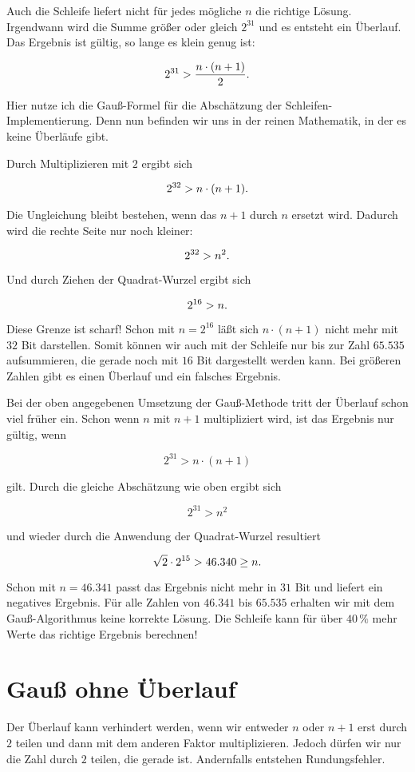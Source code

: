 Auch die Schleife liefert nicht für jedes mögliche $n$ die richtige Lösung.
Irgendwann wird die Summe größer oder gleich $2^{31}$ und es entsteht ein
Überlauf.
Das Ergebnis ist gültig, so lange es klein genug ist:

$$2^{31} > {n\cdot(n + 1)\over 2}\hbox{.}$$

\noindent Hier nutze ich die Gauß-Formel für die Abschätzung der
Schleifen-Implementierung.
Denn nun befinden wir uns in der reinen Mathematik, in der es keine
Überläufe gibt.

Durch Multiplizieren mit $2$ ergibt sich

$$2^{32} > n\cdot(n+1)\hbox{.}$$

\noindent Die Ungleichung bleibt bestehen, wenn das $n+1$ durch $n$
ersetzt wird. Dadurch wird die rechte Seite nur noch kleiner:

$$2^{32} > n^2\hbox{.}$$

\noindent Und durch Ziehen der Quadrat-Wurzel ergibt sich

$$2^{16} > n\hbox{.}$$

\noindent Diese Grenze ist scharf! Schon mit $n=2^{16}$ läßt sich
$n\cdot(n+1)$ nicht mehr mit $32$ Bit darstellen.
Somit können wir auch mit der Schleife nur bis zur Zahl $65.535$
aufsummieren, die gerade noch mit $16$ Bit dargestellt werden kann.
Bei größeren Zahlen gibt es einen Überlauf und ein falsches Ergebnis.

Bei der oben angegebenen Umsetzung der Gauß-Methode tritt der
Überlauf schon viel früher ein.
Schon wenn $n$ mit $n+1$ multipliziert wird, ist das Ergebnis nur gültig,
wenn

$$2^{31}>n\cdot(n+1)$$

\noindent gilt.
Durch die gleiche Abschätzung wie oben ergibt sich

$$2^{31}>n^2$$

\noindent und wieder durch die Anwendung der Quadrat-Wurzel resultiert

$$\sqrt{2}\cdot2^{15}>46.340\geq n\hbox{.}$$

\noindent Schon mit $n=46.341$ passt das Ergebnis nicht mehr in $31$ Bit und liefert
ein negatives Ergebnis.
Für alle Zahlen von $46.341$ bis $65.535$ erhalten wir mit dem
Gauß-Algorithmus keine korrekte Lösung.
Die Schleife kann für über $40\,\%$ mehr Werte das richtige Ergebnis
berechnen!

\section{Gauß ohne Überlauf}%
%
Der Überlauf kann verhindert werden, wenn wir entweder $n$ oder
$n+1$ erst durch $2$ teilen und dann mit dem anderen Faktor
multiplizieren.
Jedoch dürfen wir nur die Zahl durch $2$ teilen, die gerade
ist.
Andernfalls entstehen Rundungsfehler.

